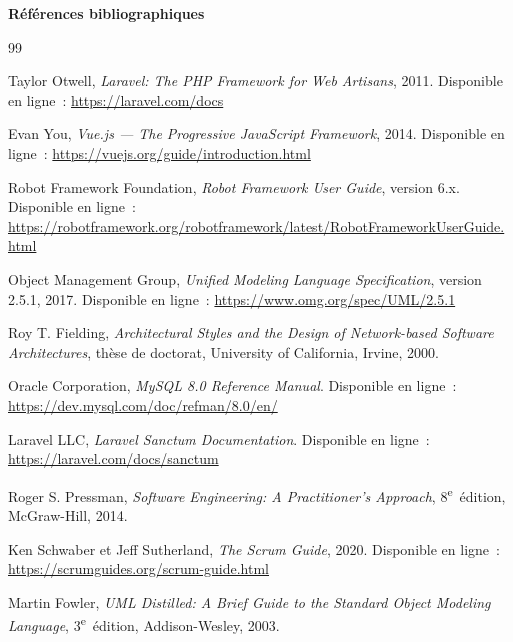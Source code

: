 \documentclass{rapportPFA}
\begin{document}
\newpage
{}
{}
\vspace*{3cm}
\begin{center}
    {\LARGE \textbf{R\'ef\'erences bibliographiques}}
\end{center}
\vspace{2cm}

\begin{thebibliography}{99}

Taylor Otwell,
\textit{Laravel: The PHP Framework for Web Artisans}, 2011.
Disponible en ligne~: \url{https://laravel.com/docs}

Evan You,
\textit{Vue.js --- The Progressive JavaScript Framework}, 2014.
Disponible en ligne~: \url{https://vuejs.org/guide/introduction.html}

Robot Framework Foundation,
\textit{Robot Framework User Guide}, version 6.x.
Disponible en ligne~: \url{https://robotframework.org/robotframework/latest/RobotFrameworkUserGuide.html}

Object Management Group,
\textit{Unified Modeling Language Specification}, version 2.5.1, 2017.
Disponible en ligne~: \url{https://www.omg.org/spec/UML/2.5.1}

Roy T. Fielding,
\textit{Architectural Styles and the Design of Network-based Software Architectures},
th\`ese de doctorat, University of California, Irvine, 2000.

Oracle Corporation,
\textit{MySQL 8.0 Reference Manual}.
Disponible en ligne~: \url{https://dev.mysql.com/doc/refman/8.0/en/}

Laravel LLC,
\textit{Laravel Sanctum Documentation}.
Disponible en ligne~: \url{https://laravel.com/docs/sanctum}

Roger S. Pressman,
\textit{Software Engineering: A Practitioner's Approach},
8\textsuperscript{e}~\'edition, McGraw-Hill, 2014.

Ken Schwaber et Jeff Sutherland,
\textit{The Scrum Guide}, 2020.
Disponible en ligne~: \url{https://scrumguides.org/scrum-guide.html}

Martin Fowler,
\textit{UML Distilled: A Brief Guide to the Standard Object Modeling Language},
3\textsuperscript{e}~\'edition, Addison-Wesley, 2003.

\end{thebibliography}
\end{document}
